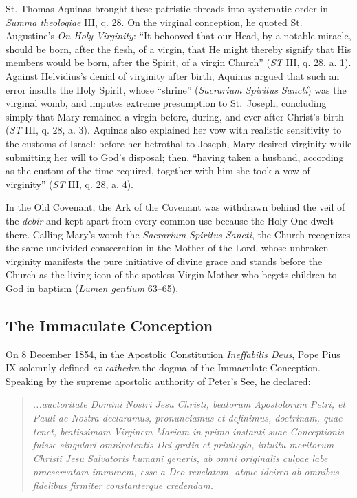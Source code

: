 St. Thomas Aquinas brought these patristic threads into systematic order in \textit{Summa theologiae} III, q. 28. On the virginal conception, he quoted St. Augustine's \textit{On Holy Virginity}: ``It behooved that our Head, by a notable miracle, should be born, after the flesh, of a virgin, that He might thereby signify that His members would be born, after the Spirit, of a virgin Church'' (\textit{ST} III, q. 28, a. 1). Against Helvidius's denial of virginity after birth, Aquinas argued that such an error insults the Holy Spirit, whose ``shrine'' (\textit{Sacrarium Spiritus Sancti}) was the virginal womb, and imputes extreme presumption to St.\ Joseph, concluding simply that Mary remained a virgin before, during, and ever after Christ's birth (\textit{ST} III, q. 28, a. 3). Aquinas also explained her vow with realistic sensitivity to the customs of Israel: before her betrothal to Joseph, Mary desired virginity while submitting her will to God's disposal; then, ``having taken a husband, according as the custom of the time required, together with him she took a vow of virginity'' (\textit{ST} III, q. 28, a. 4).

In the Old Covenant, the Ark of the Covenant was withdrawn behind the veil of the \textit{debir} and kept apart from every common use because the Holy One dwelt there. Calling Mary's womb the \textit{Sacrarium Spiritus Sancti}, the Church recognizes the same undivided consecration in the Mother of the Lord, whose unbroken virginity manifests the pure initiative of divine grace and stands before the Church as the living icon of the spotless Virgin-Mother who begets children to God in baptism (\textit{Lumen gentium} 63--65).

\subsection{The Immaculate Conception}\label{subsec:immaculate-conception}

On 8 December 1854, in the Apostolic Constitution \textit{Ineffabilis Deus}, Pope Pius IX solemnly defined \textit{ex cathedra} the dogma of the Immaculate Conception. Speaking by the supreme apostolic authority of Peter's See, he declared:

\begin{quote}\small
\textit{...auctoritate Domini Nostri Jesu Christi, beatorum Apostolorum Petri, et Pauli ac Nostra declaramus, pronunciamus et definimus, doctrinam, quae tenet, beatissimam Virginem Mariam in primo instanti suae Conceptionis fuisse singulari omnipotentis Dei gratia et privilegio, intuitu meritorum Christi Jesu Salvatoris humani generis, ab omni originalis culpae labe praeservatam immunem, esse a Deo revelatam, atque idcirco ab omnibus fidelibus firmiter constanterque credendam.}
\end{quote}

